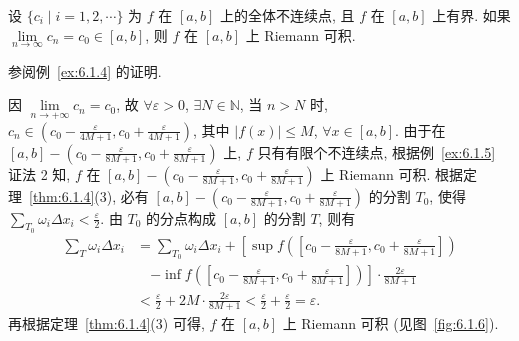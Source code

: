 \begin{figure}[htbp]
\centering
{}
\caption{}\label{fig:6.1.5}
\end{figure}

\begin{example}\label{ex:6.1.6}
设 $\{c_{i}\mid i=1,2,\cdots\}$ 为 $f$ 在 $[a,b]$ 上的全体不连续点, 且 $f$ 在 $[a,b]$ 上有界. 如果 $\lim\limits_{n\to\infty}c_{n}=c_{0}\in[a,b]$, 则 $f$ 在 $[a,b]$ 上 Riemann 可积.
\end{example}

\begin{solution}[证法 1]
参阅例~\ref{ex:6.1.4} 的证明.
\end{solution}

\begin{solution}[证法 2]
因 $\lim\limits_{n\to+\infty}c_{n}=c_{0}$, 故 $\forall\varepsilon>0$, $\exists N\in\mathbb{N}$, 当 $n>N$ 时, $c_{n}\in\left(c_{0}-\frac{\varepsilon}{4M+1},c_{0}+\frac{\varepsilon}{4M+1}\right)$, 其中 $|f(x)|\leqslant M$, $\forall x\in[a,b]$. 由于在 $[a,b]-\left(c_{0}-\frac{\varepsilon}{8M+1},c_{0}+\frac{\varepsilon}{8M+1}\right)$ 上, $f$ 只有有限个不连续点, 根据例~\ref{ex:6.1.5} 证法 2 知, $f$ 在 $[a,b]-\left(c_{0}-\frac{\varepsilon}{8M+1},c_{0}+\frac{\varepsilon}{8M+1}\right)$ 上 Riemann 可积. 根据定理~\ref{thm:6.1.4}(3), 必有 $[a,b]-\left(c_{0}-\frac{\varepsilon}{8M+1},c_{0}+\frac{\varepsilon}{8M+1}\right)$ 的分割 $T_{0}$, 使得 $\sum\limits_{T_{0}}\omega_{i}\Delta x_{i}<\frac{\varepsilon}{2}$. 由 $T_{0}$ 的分点构成 $[a,b]$ 的分割 $T$, 则有
\begin{align*}
\sum_{T}\omega_{i}\Delta x_{i}&=\sum_{T_{0}}\omega_{i}\Delta x_{i}+\left[\sup f\left(\left[c_{0}-\frac{\varepsilon}{8M+1},c_{0}+\frac{\varepsilon}{8M+1}\right]\right)\right.\\
&\quad\left.-\inf f\left(\left[c_{0}-\frac{\varepsilon}{8M+1},c_{0}+\frac{\varepsilon}{8M+1}\right]\right)\right]\cdot\frac{2\varepsilon}{8M+1}\\
&<\frac{\varepsilon}{2}+2M\cdot\frac{2\varepsilon}{8M+1}<\frac{\varepsilon}{2}+\frac{\varepsilon}{2}=\varepsilon.
\end{align*}
再根据定理~\ref{thm:6.1.4}(3) 可得, $f$ 在 $[a,b]$ 上 Riemann 可积 (见图~\ref{fig:6.1.6}).
\end{solution}

